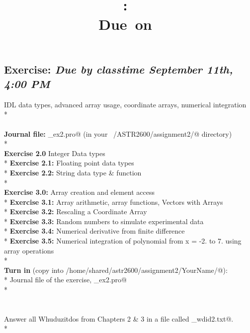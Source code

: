 \documentclass{article}
\title{\vspace{2in}\textmd{\textbf{\hmwkClass:\ \hmwkTitle}}\\\normalsize\vspace{0.1in}\small{Due\ on\ \hmwkDueDate}\\\vspace{0.1in}\large{}\vspace{3in}}
\date{}
\newcommand{\exDueDate}{September 11th, 4:00 PM}
\begin{document}
 \begin{spacing}{1.0}
 \newpage
 
 
 
 \section{\textbf{Exercise:} \emph{  Due by classtime \exDueDate}}
 
  IDL data types, advanced array usage, coordinate arrays, numerical integration\\* 
 ~\\ 
 ~\\ 
 \textrm{\textrm{\textbf{Journal file:}}\textrm{\textbf{  }}}\verb@YourName_ex2.pro@\textrm{ }\textrm{  }\textrm{(in your }\verb@~/ASTR2600/assignment2/@\textrm{ directory)}\\* 
 ~\\ 
 \textbf{Exercise 2.0} Integer Data types \\* 
 \textbf{Exercise 2.1:} Floating point data types\\* 
 \textbf{Exercise 2.2:} String data type \& \verb@string@ function\\* 
 ~\\ 
 \textbf{Exercise 3.0:}  Array creation and element access\\* 
 \textbf{Exercise 3.1:} Array arithmetic, array functions, Vectors with Arrays\\* 
 \textbf{Exercise 3.2:} Rescaling a Coordinate Array\\* 
 \textbf{Exercise 3.3:} Random numbers to simulate experimental data\\* 
 \textbf{Exercise 3.4:} Numerical derivative from finite difference\\* 
 \textbf{Exercise 3.5:} Numerical integration of polynomial from x = -2. to 7. using array operations\\* 
 ~\\ 
 \textrm{\textrm{\textbf{Turn in}}}\textrm{ (copy into }\verb@/home/shared/astr2600/assignment2/YourName/@\textrm{):}\\* 
 Journal file of the exercise, \verb@YourName_ex2.pro@\\* 
 ~\\ 
 ~\\ 
 ~\\ 
 Answer all Whuduzitdos from Chapters 2 \& 3 in a file called \verb@YourName_wdid2.txt@.\\* 

\end{spacing}
\end{document}
